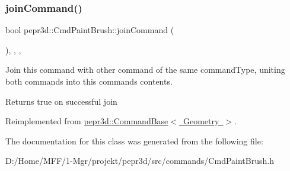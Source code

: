 \subsubsection{\texorpdfstring{joinCommand()}{joinCommand()}}
{\footnotesize\ttfamily bool pepr3d\+::\+Cmd\+Paint\+Brush\+::join\+Command (\begin{DoxyParamCaption}\item[{const \mbox{\hyperlink{classpepr3d_1_1_command_base}{Command\+Base}} \&}]{ }\end{DoxyParamCaption})\hspace{0.3cm}{\ttfamily [inline]}, {\ttfamily [override]}, {\ttfamily [protected]}, {\ttfamily [virtual]}}



Join this command with other command of the same command\+Type, uniting both commands into this command\textquotesingle{}s contents. 

\begin{DoxyReturn}{Returns}
true on successful join 
\end{DoxyReturn}


Reimplemented from \mbox{\hyperlink{classpepr3d_1_1_command_base_a9ef408154b7cb446e626e049f268abb4}{pepr3d\+::\+Command\+Base$<$ Geometry $>$}}.



The documentation for this class was generated from the following file\+:\begin{DoxyCompactItemize}
\item 
D\+:/\+Home/\+M\+F\+F/1-\/\+Mgr/projekt/pepr3d/src/commands/Cmd\+Paint\+Brush.\+h\end{DoxyCompactItemize}
